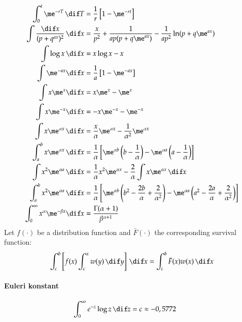 \documentclass[a4paper]{article}
\numberwithin{equation}{subsection}
\begin{document}
\begin{align}
  \int_0^t \me^{-rT} \,\dif T
  &=
  \frac{1}{r}
  \left[
    1 - \me^{-rt}
  \right]
  \\
  \int \frac{\dif x}{(p + q^{ax})^2} \,\dif x 
  &=
  \frac{x}{p^2} +
  \frac{1}{ap(p + q\me^{ax})} -
  \frac{1}{ap^2} \ln (p + q\me^{ax})
  \\
  \int \log x \,\dif x 
  &=
  x \log x - x
  \\
  \int \me^{-ax} \dif x 
  &=
  \frac{1}{a} \left[ 1 - \me^{-ax} \right]\\
  \int x \me^x \dif x 
  &=
  x \me^x - \me^x\\
  \int x \me^{-x} \dif x
  &=
  -x \me^{-x} - \me^{-x}
  \\
  \int x \me^{\alpha x} \,\dif x
  &=
  \frac{x}{\alpha} \me^{\alpha x} - \frac{1}{\alpha^2} \me^{\alpha x}
  \\
  \int_a^b x \me^{\alpha x} \,\dif x
  &=
  \frac{1}{\alpha}
  \left[
    \me^{\alpha b} 
    \left(b - \frac{1}{\alpha}\right)
    -
    \me^{\alpha a} 
    \left(a - \frac{1}{\alpha}\right)
  \right]
  \\
  \int x^2 \me^{\alpha a} \,\dif x
  &=
  \frac{1}{\alpha} x^2 \me^{\alpha x} -
  \frac{2}{\alpha} \int x \me^{\alpha x} \,\dif x
  \\
  \int_a^b x^2 \me^{\alpha a} \,\dif x
  &=
  \frac{1}{\alpha}
  \left[
    \me^{\alpha b}
    \left(
      b^2 - \frac{2b}{\alpha} + \frac{2}{\alpha^2}
    \right)
    -
    \me^{\alpha a}
    \left(
      a^2 - \frac{2a}{\alpha} + \frac{2}{\alpha^2}
    \right)
  \right]
  \\
  \int_0^\infty x^\alpha \me^{-\beta x} \dif x 
  &=
  \frac{\Gamma(\alpha + 1)}{\beta^{\alpha+1}}
\end{align}
Let $f(\cdot)$ be a distribution function and $\bar F(\cdot)$ the
corresponding survival function:
\begin{equation}
  \int_c^b \left[
    f(x)
    \int_c^x w(y) \,\dif y
  \right]
  \,\dif x
  =
  \int_c^b
  \bar F(x) w(x) \,\dif x
\end{equation}


\paragraph{Euleri konstant}
\begin{equation}
\int_0^\infty e^{-z} \log z \,\dif z = c \approx -0,5772 \qquad
\end{equation}
\end{document}
